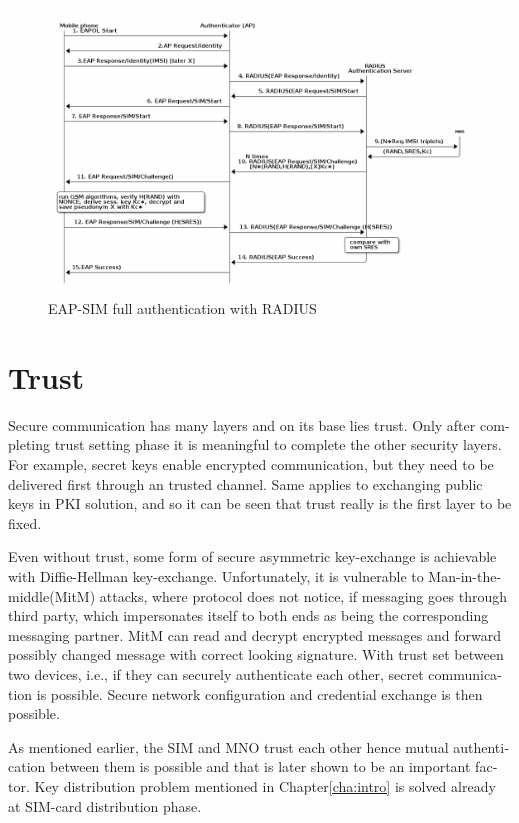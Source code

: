 \documentclass[12pt,a4paper,english]{tutthesis}
\begin{document}
\begin{otherlanguage}{english}
\begin{figure}[htb]
\centering
\includegraphics[width=.9\linewidth]{eap-sim-radius.png}
\caption{\label{fig:eap-sim-radius}EAP-SIM full authentication with RADIUS}
\end{figure}
\section{Trust}
\label{sec-2-6}

Secure communication has many layers and on its base lies trust. 
Only after completing trust setting phase it is meaningful to complete
the other security layers. For example, secret keys enable encrypted
communication, but they need to be delivered first through an trusted
channel. Same applies to exchanging public keys in PKI solution,
 and so it can be seen that trust really is the first layer to
be fixed.



Even without trust, some form of secure asymmetric key-exchange is achievable
with Diffie-Hellman key-exchange\cite{diffie1976new}. Unfortunately, it is vulnerable
to Man-in-the-middle(MitM) attacks, where protocol does not notice, 
if messaging goes through third party, which impersonates itself to 
both ends as being the corresponding messaging partner. MitM can
read and decrypt encrypted messages and forward possibly changed message with
correct looking signature.
With trust set between two devices, i.e.,  if they can securely
authenticate each other, secret communication is possible. 
Secure network configuration and credential exchange is then possible.


As mentioned earlier, the SIM and MNO trust each other hence mutual
authentication between them is possible and that is later shown to be
an important factor.  
Key distribution problem mentioned in Chapter\ref{cha:intro} is solved
already at SIM-card distribution phase. 


\end{otherlanguage}
\end{document}
